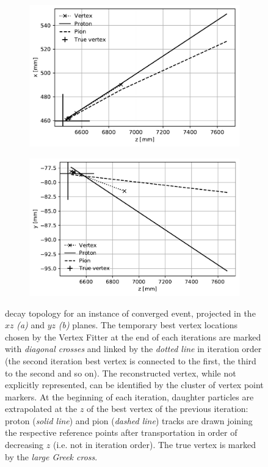 \begin{figure}[t]
	\centering
	\begin{subfigure}{.45\textwidth}
		\includegraphics[width=\textwidth]{graphics/03-vertex_reconstruction/evt_0_zx.pdf}
		\caption{}
		\label{fig:3:converged_zx}
	\end{subfigure}
	\begin{subfigure}{.45\textwidth}
		\includegraphics[width=\textwidth]{graphics/03-vertex_reconstruction/evt_0_zy.pdf}
		\caption{}
		\label{fig:3:converged_zy}
	\end{subfigure}
	\caption{\lambdadecay decay topology for an instance of converged event, projected in the $xz$ \textit{(a)} and $yz$ \textit{(b)} planes.
	The temporary best vertex locations chosen by the Vertex Fitter at the end of each iterations are marked with \textit{diagonal crosses} and linked by the \textit{dotted line} in iteration order (the second iteration best vertex is connected to the first, the third to the second and so on).
	The reconstructed vertex, while not explicitly represented, can be identified by the cluster of vertex point markers.
	At the beginning of each iteration, daughter particles are extrapolated at the $z$ of the best vertex of the previous iteration: proton (\textit{solid line}) and pion (\textit{dashed line}) tracks are drawn joining the respective reference points after transportation in order of decreasing $z$ (i.e. not in iteration order).
	The true vertex is marked by the \textit{large Greek cross}.}
	\label{fig:3:converged_event_topology}
\end{figure}


